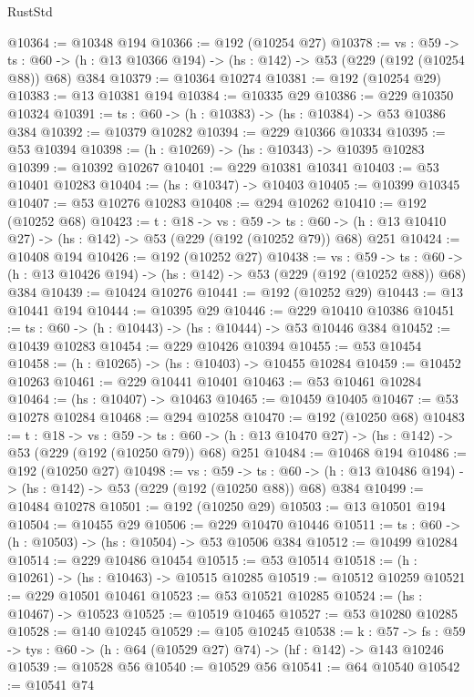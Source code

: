 \begin{lexlean}{RustStd}
\begin{coremodule}
@10364 := @10348 @194
@10366 := @192 (@10254 @27)
@10378 := {vs : @59} ->
  {ts : @60} -> (h : @13 @10366 @194) -> (hs : @142) -> @53 (@229 (@192 (@10254 @88)) @68) @384
@10379 := @10364 @10274
@10381 := @192 (@10254 @29)
@10383 := @13 @10381 @194
@10384 := @10335 @29
@10386 := @229 @10350 @10324
@10391 := {ts : @60} -> (h : @10383) -> (hs : @10384) -> @53 @10386 @384
@10392 := @10379 @10282
@10394 := @229 @10366 @10334
@10395 := @53 @10394
@10398 := (h : @10269) -> (hs : @10343) -> @10395 @10283
@10399 := @10392 @10267
@10401 := @229 @10381 @10341
@10403 := @53 @10401 @10283
@10404 := (hs : @10347) -> @10403
@10405 := @10399 @10345
@10407 := @53 @10276 @10283
@10408 := @294 @10262
@10410 := @192 (@10252 @68)
@10423 := {t : @18} ->
  {vs : @59} ->
  {ts : @60} -> (h : @13 @10410 @27) -> (hs : @142) -> @53 (@229 (@192 (@10252 @79)) @68) @251
@10424 := @10408 @194
@10426 := @192 (@10252 @27)
@10438 := {vs : @59} ->
  {ts : @60} -> (h : @13 @10426 @194) -> (hs : @142) -> @53 (@229 (@192 (@10252 @88)) @68) @384
@10439 := @10424 @10276
@10441 := @192 (@10252 @29)
@10443 := @13 @10441 @194
@10444 := @10395 @29
@10446 := @229 @10410 @10386
@10451 := {ts : @60} -> (h : @10443) -> (hs : @10444) -> @53 @10446 @384
@10452 := @10439 @10283
@10454 := @229 @10426 @10394
@10455 := @53 @10454
@10458 := (h : @10265) -> (hs : @10403) -> @10455 @10284
@10459 := @10452 @10263
@10461 := @229 @10441 @10401
@10463 := @53 @10461 @10284
@10464 := (hs : @10407) -> @10463
@10465 := @10459 @10405
@10467 := @53 @10278 @10284
@10468 := @294 @10258
@10470 := @192 (@10250 @68)
@10483 := {t : @18} ->
  {vs : @59} ->
  {ts : @60} -> (h : @13 @10470 @27) -> (hs : @142) -> @53 (@229 (@192 (@10250 @79)) @68) @251
@10484 := @10468 @194
@10486 := @192 (@10250 @27)
@10498 := {vs : @59} ->
  {ts : @60} -> (h : @13 @10486 @194) -> (hs : @142) -> @53 (@229 (@192 (@10250 @88)) @68) @384
@10499 := @10484 @10278
@10501 := @192 (@10250 @29)
@10503 := @13 @10501 @194
@10504 := @10455 @29
@10506 := @229 @10470 @10446
@10511 := {ts : @60} -> (h : @10503) -> (hs : @10504) -> @53 @10506 @384
@10512 := @10499 @10284
@10514 := @229 @10486 @10454
@10515 := @53 @10514
@10518 := (h : @10261) -> (hs : @10463) -> @10515 @10285
@10519 := @10512 @10259
@10521 := @229 @10501 @10461
@10523 := @53 @10521 @10285
@10524 := (hs : @10467) -> @10523
@10525 := @10519 @10465
@10527 := @53 @10280 @10285
@10528 := @140 @10245
@10529 := @105 @10245
@10538 := {k : @57} ->
  {fs : @59} -> {tys : @60} -> (h : @64 (@10529 @27) @74) -> (hf : @142) -> @143 @10246
@10539 := @10528 @56
@10540 := @10529 @56
@10541 := @64 @10540
@10542 := @10541 @74

\end{coremodule}
\end{lexlean}
